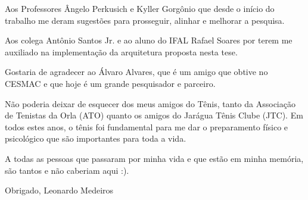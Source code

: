 Aos Professores Ângelo Perkusich e Kyller Gorgônio que desde o início do trabalho me deram sugestões para prosseguir, alinhar e melhorar a pesquisa.

Aos colega Antônio Santos Jr. e ao aluno do IFAL Rafael Soares por terem me auxiliado na implementação da arquitetura proposta nesta tese.

Gostaria de agradecer ao Álvaro Alvares, que é um amigo que obtive no CESMAC e que hoje é um grande pesquisador e parceiro.

Não poderia deixar de esquecer dos meus amigos do Tênis, tanto da Associação de Tenistas da Orla (ATO) quanto os amigos do Jarágua Tênis Clube (JTC). Em todos estes anos, o tênis foi fundamental para me dar o preparamento físico e psicológico que são importantes para toda a vida. 

A todas as pessoas que passaram por minha vida e que estão em minha memória, são tantos e não caberiam aqui :).

Obrigado, \linebreak
Leonardo Medeiros



